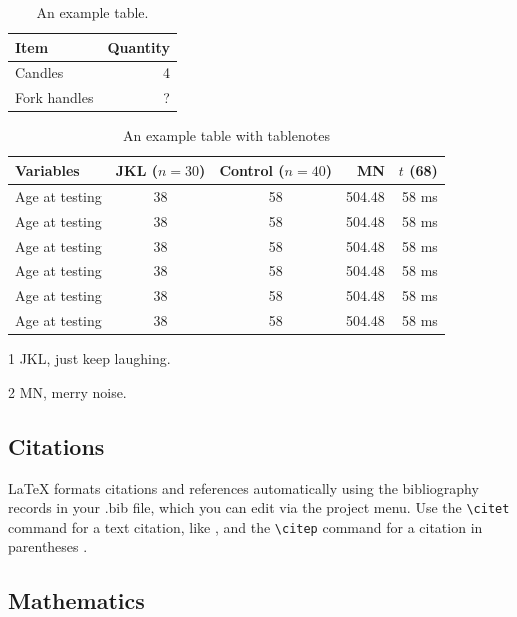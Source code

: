 \documentclass[fleqn,10pt]{physiome}
\begin{document}
\begin{table}[ht]\centering
\caption{An example table.}\label{tab:widgets}
\begin{tabular}{l r}
\toprule
Item & Quantity \\\midrule
Candles & 4 \\
Fork handles & ?\\
\bottomrule
\end{tabular}
\end{table}

\begin{table}[hbt!]\centering
\begin{threeparttable}
\caption{An example table with tablenotes}\label{tab:withnotes}

\begin{tabular}{lccrr}
\toprule
Variables & JKL ($n=30$) & Control ($n=40$) & MN & $t$ (68)\\
\midrule
Age at testing & 38 & 58\tnote{1} & 504.48 & 58 ms\\
Age at testing & 38 & 58 & 504.48 & 58 ms\\
Age at testing & 38 & 58 & 504.48 & 58 ms\\
Age at testing & 38 & 58 & 504.48 & 58 ms\\
Age at testing\tnote{2} & 38 & 58 & 504.48 & 58 ms\\
Age at testing & 38 & 58 & 504.48 & 58 ms\\
\bottomrule
\end{tabular}
\begin{tablenotes}
\item[1] JKL, just keep laughing.
\item[2] MN, merry noise.
\end{tablenotes}
\end{threeparttable}
\end{table}

\subsection{Citations}

LaTeX formats citations and references automatically using the bibliography records in your .bib file, which you can edit via the project menu. Use the \verb|\citet| command for a text citation, like \citet{lees2010theoretical}, and the \verb|\citep| command for a citation in parentheses \citep{McQuilton01012012}.

\subsection{Mathematics}
\end{document}

